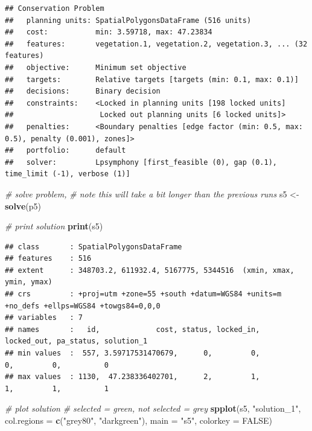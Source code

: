 \documentclass[12pt,]{book}
\newenvironment{Shaded}{\begin{snugshade}}{\end{snugshade}}
\newcommand{\KeywordTok}[1]{\textcolor[rgb]{0.13,0.29,0.53}{\textbf{#1}}}
\newcommand{\DataTypeTok}[1]{\textcolor[rgb]{0.13,0.29,0.53}{#1}}
\newcommand{\StringTok}[1]{\textcolor[rgb]{0.31,0.60,0.02}{#1}}
\newcommand{\CommentTok}[1]{\textcolor[rgb]{0.56,0.35,0.01}{\textit{#1}}}
\newcommand{\OtherTok}[1]{\textcolor[rgb]{0.56,0.35,0.01}{#1}}
\newcommand{\NormalTok}[1]{#1}
\begin{document}
\begin{verbatim}
## Conservation Problem
##   planning units: SpatialPolygonsDataFrame (516 units)
##   cost:           min: 3.59718, max: 47.23834
##   features:       vegetation.1, vegetation.2, vegetation.3, ... (32 features)
##   objective:      Minimum set objective 
##   targets:        Relative targets [targets (min: 0.1, max: 0.1)]
##   decisions:      Binary decision 
##   constraints:    <Locked in planning units [198 locked units]
##                    Locked out planning units [6 locked units]>
##   penalties:      <Boundary penalties [edge factor (min: 0.5, max: 0.5), penalty (0.001), zones]>
##   portfolio:      default
##   solver:         Lpsymphony [first_feasible (0), gap (0.1), time_limit (-1), verbose (1)]
\end{verbatim}

\begin{Shaded}
\begin{Highlighting}[]
\CommentTok{# solve problem,}
\CommentTok{# note this will take a bit longer than the previous runs}
\NormalTok{s5 <-}\StringTok{ }\KeywordTok{solve}\NormalTok{(p5)}

\CommentTok{# print solution}
\KeywordTok{print}\NormalTok{(s5)}
\end{Highlighting}
\end{Shaded}

\begin{verbatim}
## class       : SpatialPolygonsDataFrame 
## features    : 516 
## extent      : 348703.2, 611932.4, 5167775, 5344516  (xmin, xmax, ymin, ymax)
## crs         : +proj=utm +zone=55 +south +datum=WGS84 +units=m +no_defs +ellps=WGS84 +towgs84=0,0,0 
## variables   : 7
## names       :   id,             cost, status, locked_in, locked_out, pa_status, solution_1 
## min values  :  557, 3.59717531470679,      0,         0,          0,         0,          0 
## max values  : 1130,  47.238336402701,      2,         1,          1,         1,          1
\end{verbatim}

\begin{Shaded}
\begin{Highlighting}[]
\CommentTok{# plot solution}
\CommentTok{# selected = green, not selected = grey}
\KeywordTok{spplot}\NormalTok{(s5, }\StringTok{"solution_1"}\NormalTok{, }\DataTypeTok{col.regions =} \KeywordTok{c}\NormalTok{(}\StringTok{"grey80"}\NormalTok{, }\StringTok{"darkgreen"}\NormalTok{), }\DataTypeTok{main =} \StringTok{"s5"}\NormalTok{,}
       \DataTypeTok{colorkey =} \OtherTok{FALSE}\NormalTok{)}
\end{Highlighting}
\end{Shaded}
\end{document}
